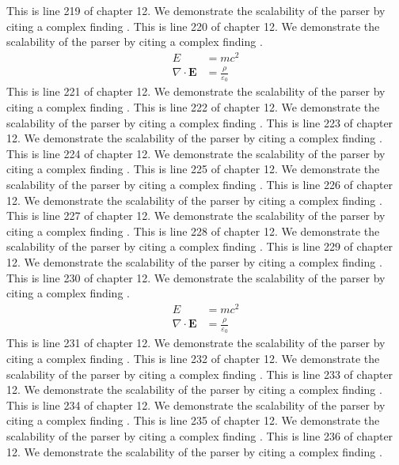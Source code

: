 This is line 219 of chapter 12. We demonstrate the scalability of the parser by citing a complex finding \cite{ref12_219}.
This is line 220 of chapter 12. We demonstrate the scalability of the parser by citing a complex finding \cite{ref12_220}.
\begin{align*}
  E &= mc^2 \\
  \nabla \cdot \mathbf{E} &= \frac{\rho}{\varepsilon_0}
\end{align*}
This is line 221 of chapter 12. We demonstrate the scalability of the parser by citing a complex finding \cite{ref12_221}.
This is line 222 of chapter 12. We demonstrate the scalability of the parser by citing a complex finding \cite{ref12_222}.
This is line 223 of chapter 12. We demonstrate the scalability of the parser by citing a complex finding \cite{ref12_223}.
This is line 224 of chapter 12. We demonstrate the scalability of the parser by citing a complex finding \cite{ref12_224}.
This is line 225 of chapter 12. We demonstrate the scalability of the parser by citing a complex finding \cite{ref12_225}.
This is line 226 of chapter 12. We demonstrate the scalability of the parser by citing a complex finding \cite{ref12_226}.
This is line 227 of chapter 12. We demonstrate the scalability of the parser by citing a complex finding \cite{ref12_227}.
This is line 228 of chapter 12. We demonstrate the scalability of the parser by citing a complex finding \cite{ref12_228}.
This is line 229 of chapter 12. We demonstrate the scalability of the parser by citing a complex finding \cite{ref12_229}.
This is line 230 of chapter 12. We demonstrate the scalability of the parser by citing a complex finding \cite{ref12_230}.
\begin{align*}
  E &= mc^2 \\
  \nabla \cdot \mathbf{E} &= \frac{\rho}{\varepsilon_0}
\end{align*}
This is line 231 of chapter 12. We demonstrate the scalability of the parser by citing a complex finding \cite{ref12_231}.
This is line 232 of chapter 12. We demonstrate the scalability of the parser by citing a complex finding \cite{ref12_232}.
This is line 233 of chapter 12. We demonstrate the scalability of the parser by citing a complex finding \cite{ref12_233}.
This is line 234 of chapter 12. We demonstrate the scalability of the parser by citing a complex finding \cite{ref12_234}.
This is line 235 of chapter 12. We demonstrate the scalability of the parser by citing a complex finding \cite{ref12_235}.
This is line 236 of chapter 12. We demonstrate the scalability of the parser by citing a complex finding \cite{ref12_236}.
